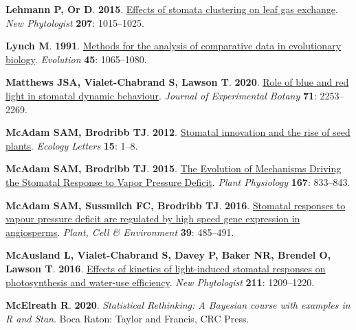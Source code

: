 \documentclass[
  letterpaper,
  DIV=11,
  numbers=noendperiod]{scrartcl}
\newlength{\cslhangindent}
\newenvironment{CSLReferences}[2] %
 {\begin{list}{}{%
  \setlength{\itemindent}{0pt}
  \setlength{\leftmargin}{0pt}
  \setlength{\parsep}{0pt}
  \ifodd #1
   \setlength{\leftmargin}{\cslhangindent}
   \setlength{\itemindent}{-1\cslhangindent}
  \fi
  \setlength{\itemsep}{#2\baselineskip}}}
 {\end{list}}
\begin{document}
\begin{CSLReferences}{0}{1}
\textbf{\textbf{Lehmann P}, \textbf{Or D}}. \textbf{2015}.
\href{https://doi.org/10.1111/nph.13442}{Effects of stomata clustering
on leaf gas exchange}. \emph{New Phytologist} \textbf{207}: 1015--1025.

\textbf{\textbf{Lynch M}}. \textbf{1991}.
\href{https://doi.org/10.1111/j.1558-5646.1991.tb04375.x}{Methods for
the analysis of comparative data in evolutionary biology}.
\emph{Evolution} \textbf{45}: 1065--1080.

\textbf{\textbf{Matthews JSA}, \textbf{Vialet-Chabrand S},
\textbf{Lawson T}}. \textbf{2020}.
\href{https://doi.org/10.1093/jxb/erz563}{Role of blue and red light in
stomatal dynamic behaviour}. \emph{Journal of Experimental Botany}
\textbf{71}: 2253--2269.

\textbf{\textbf{McAdam SAM}, \textbf{Brodribb TJ}}. \textbf{2012}.
\href{https://doi.org/10.1111/j.1461-0248.2011.01700.x}{Stomatal
innovation and the rise of seed plants}. \emph{Ecology Letters}
\textbf{15}: 1--8.

\textbf{\textbf{McAdam SAM}, \textbf{Brodribb TJ}}. \textbf{2015}.
\href{https://doi.org/10.1104/pp.114.252940}{The {Evolution} of
{Mechanisms Driving} the {Stomatal Response} to {Vapor Pressure
Deficit}}. \emph{Plant Physiology} \textbf{167}: 833--843.

\textbf{\textbf{McAdam SAM}, \textbf{Sussmilch FC}, \textbf{Brodribb
TJ}}. \textbf{2016}. \href{https://doi.org/10.1111/pce.12633}{Stomatal
responses to vapour pressure deficit are regulated by high speed gene
expression in angiosperms}. \emph{Plant, Cell \& Environment}
\textbf{39}: 485--491.

\textbf{\textbf{McAusland L}, \textbf{Vialet-Chabrand S}, \textbf{Davey
P}, \textbf{Baker NR}, \textbf{Brendel O}, \textbf{Lawson T}}.
\textbf{2016}. \href{https://doi.org/10.1111/nph.14000}{Effects of
kinetics of light-induced stomatal responses on photosynthesis and
water-use efficiency}. \emph{New Phytologist} \textbf{211}: 1209--1220.

\textbf{\textbf{McElreath R}}. \textbf{2020}. \emph{Statistical
{Rethinking}: A {Bayesian} course with examples in {R} and {Stan}}. Boca
Raton: {Taylor and Francis, CRC Press}.


\end{CSLReferences}
\end{document}
